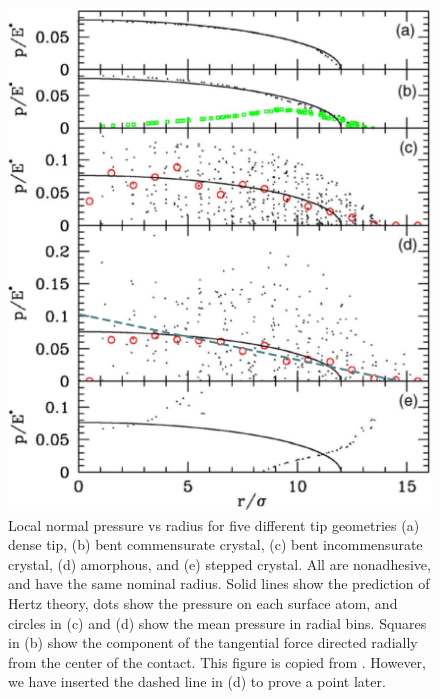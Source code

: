 \documentclass[twoside,english]{uiofysmaster}
\begin{document}
\begin{multicols}{2}
\begin{figure}[H]
	\centering
	\captionsetup{width=\linewidth}
	\includegraphics[width=0.9\linewidth]{figures/Robbins/results2}
	\caption{Local normal pressure vs radius for five
		different tip geometries (a) dense tip, (b) bent commensurate crystal, (c) bent incommensurate crystal, (d) amorphous, and (e) stepped crystal. All are nonadhesive, and have the same nominal radius.
		Solid lines	show the prediction of Hertz theory, dots show the pressure on each surface atom, and circles in (c) and (d) show the mean pressure in radial bins. Squares in (b) show the component of the tangential force directed radially from the center of the contact.
		This figure is copied from \cite{RobbinsSingleAsperity}. However, we have inserted the dashed line in (d) to prove a point later.}
	\label{fig:robbinsResults}
\end{figure}

\end{multicols}




  
\end{document}
